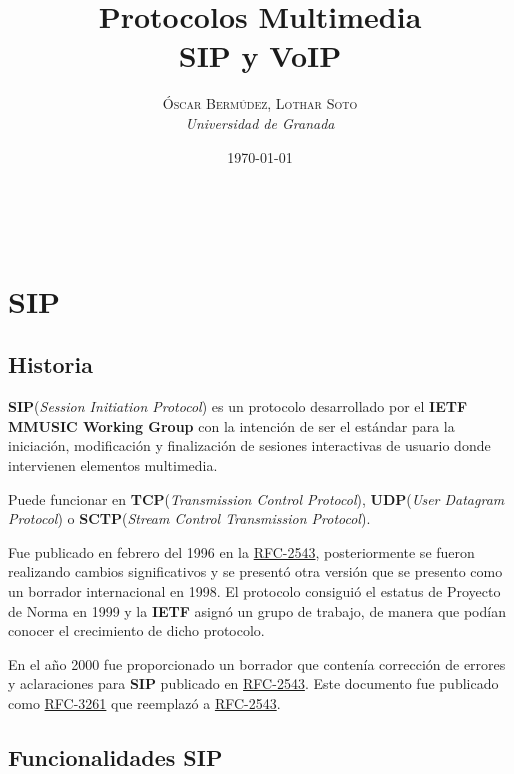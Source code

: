 \documentclass[a4paper, 11pt]{article} %
\title{\textbf{Protocolos Multimedia}\\ %
\vspace{20 pt}
SIP y VoIP} %
\author{\textsc{Óscar Bermúdez, Lothar Soto} %
\\{\textit{Universidad de Granada}}} %
\date{\today} %
\makeatletter
\newcommand{\RFC}[1]{\href{https://www.ietf.org/rfc/rfc#1.txt}{RFC-#1}}
\renewcommand{\maketitle}{ %
\begin{center} %
{\Huge\@title} %
\end{center}

\vspace{20pt} %

\begin{flushright} %
{\large\@author} %
\\\@date %

\vspace{40pt} %
\end{flushright}
}
\makeatother
\begin{document}
\maketitle %

{\parskip=2pt
\tableofcontents
}
\pagebreak

\section{SIP}
	\subsection{Historia}
	\textbf{SIP}(\textit{Session Initiation Protocol}) es un protocolo desarrollado por el \textbf{IETF MMUSIC Working Group} con la intención de ser el estándar para la iniciación, modificación y finalización de sesiones interactivas de usuario donde intervienen elementos multimedia.
	
	Puede funcionar en \textbf{TCP}(\textit{Transmission Control Protocol}), \textbf{UDP}(\textit{User Datagram Protocol}) o \textbf{SCTP}(\textit{Stream Control Transmission Protocol}).
	
	Fue publicado en febrero del 1996 en la \RFC{2543}, posteriormente se fueron realizando cambios significativos y se presentó otra versión que se presento como un borrador internacional en 1998. El protocolo consiguió el estatus de Proyecto de Norma en 1999 y la \textbf{IETF} asignó un grupo de trabajo, de manera que podían conocer el crecimiento de dicho protocolo.
	
	En el año 2000 fue proporcionado un borrador que contenía corrección de errores y aclaraciones para \textbf{SIP} publicado en \RFC{2543}. Este documento fue publicado como \RFC{3261} que reemplazó a \RFC{2543}.
	
	\subsection{Funcionalidades SIP}
\end{document}
